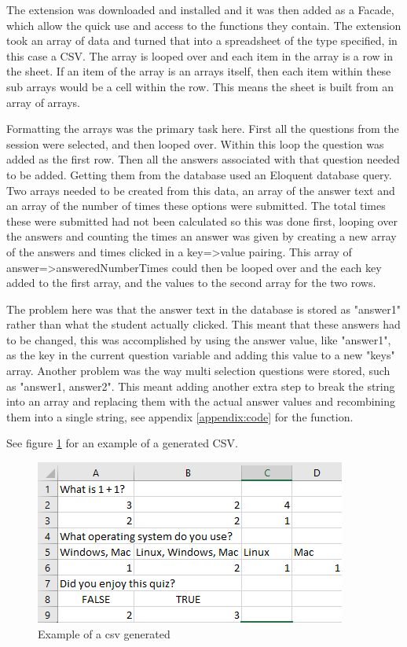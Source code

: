 The extension was downloaded and installed and it was then added as a Facade\cite{laravel-facades}, which allow the quick use and access to the functions they contain. The extension took an array of data and turned that into a spreadsheet of the type specified, in this case a CSV. The array is looped over and each item in the array is a row in the sheet. If an item of the array is an arrays itself, then each item within these sub arrays would be a cell within the row. This means the sheet is built from an array of arrays. 

Formatting the arrays was the primary task here. First all the questions from the session were selected, and then looped over. Within this loop the question was added as the first row. Then all the answers associated with that question needed to be added. Getting them from the database used an Eloquent database query. Two arrays needed to be created from this data, an array of the answer text and an array of the number of times these options were submitted. The total times these were submitted had not been calculated so this was done first, looping over the answers and counting the times an answer was given by creating a new array of the answers and times clicked in a key=>value pairing. This array of answer=>answeredNumberTimes could then be looped over and the each key added to the first array, and the values to the second array for the two rows.

The problem here was that the answer text in the database is stored as "answer1" rather than what the student actually clicked. This meant that these answers had to be changed, this was accomplished by using the answer value, like "answer1", as the key in the current question variable and adding this value to a new "keys" array. Another problem was the way multi selection questions were stored, such as "answer1, answer2". This meant adding another extra step to break the string into an array and replacing them with the actual answer values and recombining them into a single string, see appendix \ref{appendix:code} for the function.

See figure \ref{fig:csv-example} for an example of a generated CSV.
\begin{figure}
	\caption{Example of a csv generated}
	\centerline{\includegraphics{Chapter2/Iter-10/csv-example}}
	\label{fig:csv-example}
\end{figure}


